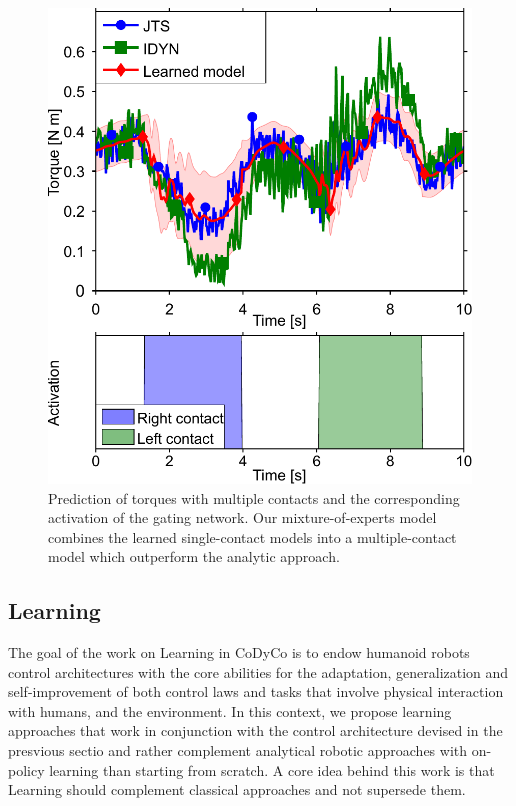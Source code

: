\documentclass[final,5p,twocolumn]{elsarticle}
\begin{document}
\begin{figure}[t]
\begin{minipage}{.52\linewidth}
			\includegraphics[width=.89\linewidth]{images/exp3_both}
			\caption{Prediction of torques with multiple contacts and the corresponding activation of the gating network.
			Our mixture-of-experts model combines the learned single-contact models into a multiple-contact model which outperform the analytic approach.
			}
			\label{fig:exp3:gating}
		\end{minipage}	
	\end{figure}
	


\subsection{Learning}

The goal of the work on Learning in CoDyCo is to endow humanoid robots control architectures with the core abilities for the adaptation, generalization and self-improvement of both control laws and tasks that involve physical interaction with humans, and the environment. In this context, we propose learning approaches that work in conjunction with the control architecture devised in the presvious sectio  and rather complement analytical robotic approaches with on-policy learning than starting from scratch. A core idea behind this work is that Learning should complement classical approaches and not supersede them.
\end{document}

